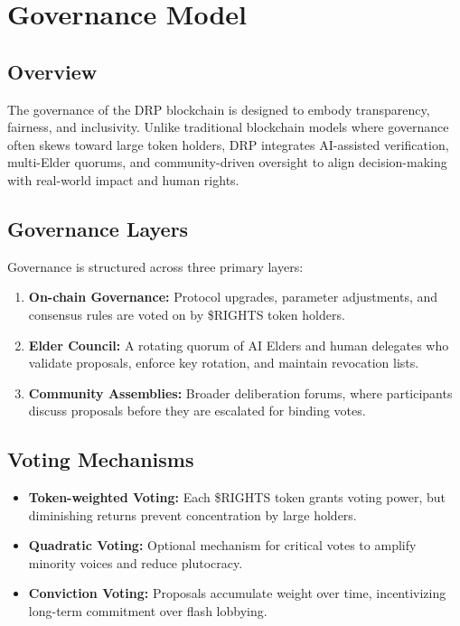 \documentclass[11pt,a4paper]{article}
\begin{document}
\section{Governance Model}

\subsection{Overview}
The governance of the DRP blockchain is designed to embody transparency, fairness, and inclusivity. Unlike traditional blockchain models where governance often skews toward large token holders, DRP integrates AI-assisted verification, multi-Elder quorums, and community-driven oversight to align decision-making with real-world impact and human rights.

\subsection{Governance Layers}
Governance is structured across three primary layers:
\begin{enumerate}
    \item \textbf{On-chain Governance:} Protocol upgrades, parameter adjustments, and consensus rules are voted on by \$RIGHTS token holders.
    \item \textbf{Elder Council:} A rotating quorum of AI Elders and human delegates who validate proposals, enforce key rotation, and maintain revocation lists.
    \item \textbf{Community Assemblies:} Broader deliberation forums, where participants discuss proposals before they are escalated for binding votes.
\end{enumerate}

\subsection{Voting Mechanisms}
\begin{itemize}
    \item \textbf{Token-weighted Voting:} Each \$RIGHTS token grants voting power, but diminishing returns prevent concentration by large holders.
    \item \textbf{Quadratic Voting:} Optional mechanism for critical votes to amplify minority voices and reduce plutocracy.
    \item \textbf{Conviction Voting:} Proposals accumulate weight over time, incentivizing long-term commitment over flash lobbying.
\end{itemize}
\end{document}
